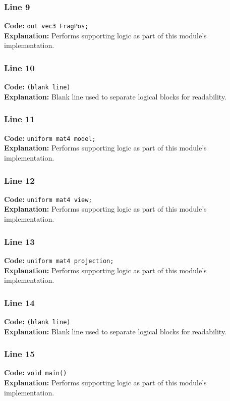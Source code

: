 \documentclass[11pt,a4paper]{article}
\begin{document}
\subsubsection*{Line 9}
\textbf{Code:} \verb|out vec3 FragPos;|\\
\textbf{Explanation:} Performs supporting logic as part of this module's implementation.

\subsubsection*{Line 10}
\textbf{Code:} \texttt{(blank line)}\\
\textbf{Explanation:} Blank line used to separate logical blocks for readability.

\subsubsection*{Line 11}
\textbf{Code:} \verb|uniform mat4 model;|\\
\textbf{Explanation:} Performs supporting logic as part of this module's implementation.

\subsubsection*{Line 12}
\textbf{Code:} \verb|uniform mat4 view;|\\
\textbf{Explanation:} Performs supporting logic as part of this module's implementation.

\subsubsection*{Line 13}
\textbf{Code:} \verb|uniform mat4 projection;|\\
\textbf{Explanation:} Performs supporting logic as part of this module's implementation.

\subsubsection*{Line 14}
\textbf{Code:} \texttt{(blank line)}\\
\textbf{Explanation:} Blank line used to separate logical blocks for readability.

\subsubsection*{Line 15}
\textbf{Code:} \verb|void main()|\\
\textbf{Explanation:} Performs supporting logic as part of this module's implementation.
\end{document}

